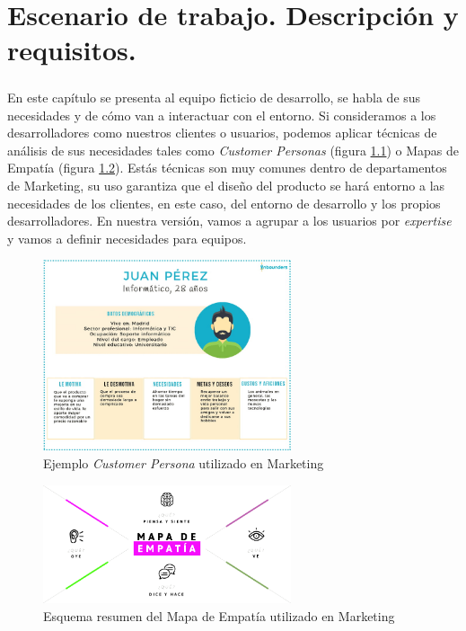 \chapter{Escenario de trabajo. Descripción y requisitos.}\label{sec:EscenarioTrabajo}

\paragraph{}En este capítulo se presenta al equipo ficticio de desarrollo, se habla
de sus necesidades y de cómo van a interactuar con el entorno. Si consideramos a los
desarrolladores como nuestros clientes o usuarios, podemos aplicar técnicas de análisis
de sus necesidades tales como \textit{Customer Personas} (figura \ref{fig:customer_persona})
o Mapas de Empatía (figura \ref{fig:mapa_empatia}). Estás técnicas son muy comunes
dentro de departamentos de Marketing, su uso garantiza que el diseño del producto se
hará entorno a las necesidades de los clientes, en este caso, del entorno de desarrollo
y los propios desarrolladores. En nuestra versión, vamos a agrupar a los usuarios por
\textit{expertise} y vamos a definir necesidades para equipos.

\begin{figure}[ht]
    \centering
    \includegraphics[width=0.65\textwidth]{imgs/buyer-persona-ejemplo.jpg}
    \caption{Ejemplo \textit{Customer Persona} utilizado en Marketing}
    \label{fig:customer_persona}
\end{figure}

\begin{figure}[H]
    \centering
    \includegraphics[width=0.65\textwidth]{imgs/mapa-empatia.png}
    \caption{Esquema resumen del Mapa de Empatía utilizado en Marketing}
    \label{fig:mapa_empatia}
\end{figure}

